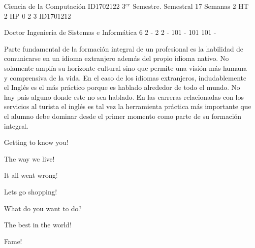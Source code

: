 \documentclass[a4paper,8pt]{article}
\begin{document}
\setNombreProfesor{}
\setGradoProfesorAbreviado{}
\sylabusHeader

\academicaTable
{Ciencia de la Computación} %
{ID1702122} %
{3$^{er}$ Semestre.} %
{Semestral} %
{17 Semanas} %
{2 HT} %
{2 HP} %
{0} %
{}  %
{2} %
{3} %
{ID1701212} %

\administrativaTable
{Doctor} %
{Ingeniería de Sistemas e Informática} %
{6} %
{2} %
{-} %
{2} %
{2} %
{-} %
{101} %
{-} %
{101} %
{101} %
{-} %


\begin{fundamentacion}
Parte fundamental de la formación integral de un profesional es la habilidad de comunicarse en un idioma extranjero además del propio idioma nativo. No solamente amplía su horizonte cultural sino que permite una visión más humana y comprensiva de la vida. En el caso de los idiomas extranjeros, indudablemente el Inglés es el 
más práctico porque es hablado alrededor de todo el mundo. No hay país alguno donde este no sea hablado. En las carreras relacionadas con los servicios al turista el inglés es tal vez la herramienta práctica más importante que el alumno debe dominar desde el primer momento como parte de su formación integral.

\end{fundamentacion}

\begin{sumilla}
\item Getting to know you!
\item The way we live!
\item It all went wrong!
\item Lets go shopping!
\item What do you want to do?
\item The best in the world!
\item Fame!

\end{sumilla}
\end{document}
